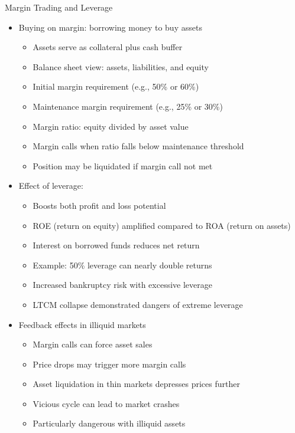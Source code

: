 \documentclass[10pt]{beamer}
\begin{document}
\begin{frame}{Margin Trading and Leverage}
  \begin{itemize}[<+->]
    \item Buying on margin: borrowing money to buy assets
      \begin{itemize}
        \item Assets serve as collateral plus cash buffer
        \item Balance sheet view: assets, liabilities, and equity
        \item Initial margin requirement (e.g., 50\% or 60\%)
        \item Maintenance margin requirement (e.g., 25\% or 30\%)
        \item Margin ratio: equity divided by asset value
        \item Margin calls when ratio falls below maintenance threshold
        \item Position may be liquidated if margin call not met
      \end{itemize}
    \item Effect of leverage:
      \begin{itemize}
        \item Boosts both profit and loss potential
        \item ROE (return on equity) amplified compared to ROA (return on assets)
        \item Interest on borrowed funds reduces net return
        \item Example: 50\% leverage can nearly double returns
        \item Increased bankruptcy risk with excessive leverage
        \item LTCM collapse demonstrated dangers of extreme leverage
      \end{itemize}
    \item Feedback effects in illiquid markets
      \begin{itemize}
        \item Margin calls can force asset sales
        \item Price drops may trigger more margin calls
        \item Asset liquidation in thin markets depresses prices further
        \item Vicious cycle can lead to market crashes
        \item Particularly dangerous with illiquid assets
      \end{itemize}
  \end{itemize}
\end{frame}
\end{document}

